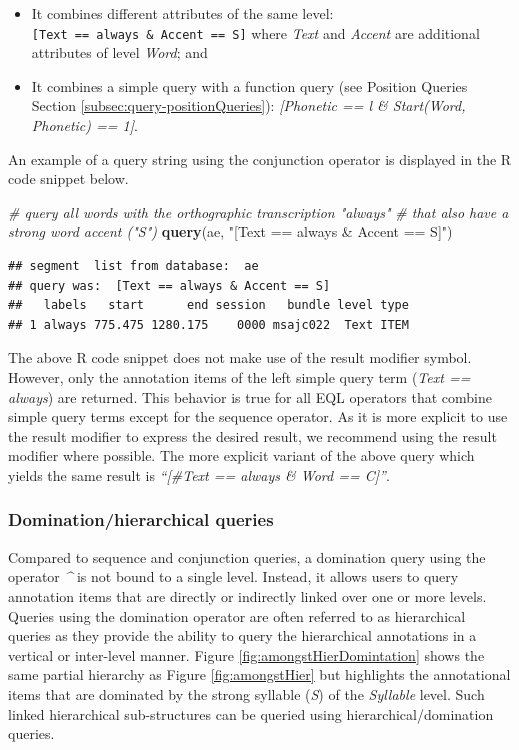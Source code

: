 \documentclass[]{book}
\newenvironment{Shaded}{\begin{snugshade}}{\end{snugshade}}
\newcommand{\CommentTok}[1]{\textcolor[rgb]{0.56,0.35,0.01}{\textit{#1}}}
\newcommand{\KeywordTok}[1]{\textcolor[rgb]{0.13,0.29,0.53}{\textbf{#1}}}
\newcommand{\NormalTok}[1]{#1}
\newcommand{\StringTok}[1]{\textcolor[rgb]{0.31,0.60,0.02}{#1}}
\providecommand{\tightlist}{%
  \setlength{\itemsep}{0pt}\setlength{\parskip}{0pt}}
\begin{document}
\begin{itemize}
\tightlist
\item
  It combines different attributes of the same level: \texttt{{[}Text\ ==\ always\ \&\ Accent\ ==\ S{]}} where \emph{Text} and \emph{Accent} are additional attributes of level \emph{Word}; and
\item
  It combines a simple query with a function query (see Position Queries Section \ref{subsec:query-positionQueries}): \emph{{[}Phonetic == l \& Start(Word, Phonetic) == 1{]}}.
\end{itemize}

An example of a query string using the conjunction operator is displayed in the R code snippet below.

\begin{Shaded}
\begin{Highlighting}[]
\CommentTok{# query all words with the orthographic transcription "always"}
\CommentTok{# that also have a strong word accent ("S")}
\KeywordTok{query}\NormalTok{(ae, }\StringTok{"[Text == always & Accent == S]"}\NormalTok{)}
\end{Highlighting}
\end{Shaded}

\begin{verbatim}
## segment  list from database:  ae 
## query was:  [Text == always & Accent == S] 
##   labels   start      end session   bundle level type
## 1 always 775.475 1280.175    0000 msajc022  Text ITEM
\end{verbatim}

The above R code snippet does not make use of the result modifier symbol. However, only the annotation items of the left simple query term (\emph{Text == always}) are returned. This behavior is true for all EQL operators that combine simple query terms except for the sequence operator. As it is more explicit to use the result modifier to express the desired result, we recommend using the result modifier where possible. The more explicit variant of the above query which yields the same result is \emph{``{[}\#Text == always \& Word == C{]}''}.

\hypertarget{subsubsec:query_dominationQueries}{%
\subsubsection{Domination/hierarchical queries}\label{subsubsec:query_dominationQueries}}

Compared to sequence and conjunction queries, a domination query using the operator \emph{\^{}} is not bound to a single level. Instead, it allows users to query annotation items that are directly or indirectly linked over one or more levels. Queries using the domination operator are often referred to as hierarchical queries as they provide the ability to query the hierarchical annotations in a vertical or inter-level manner. Figure \ref{fig:amongstHierDomintation} shows the same partial hierarchy as Figure \ref{fig:amongstHier} but highlights the annotational items that are dominated by the strong syllable (\emph{S}) of the \emph{Syllable} level. Such linked hierarchical sub-structures can be queried using hierarchical/domination queries.
\end{document}
